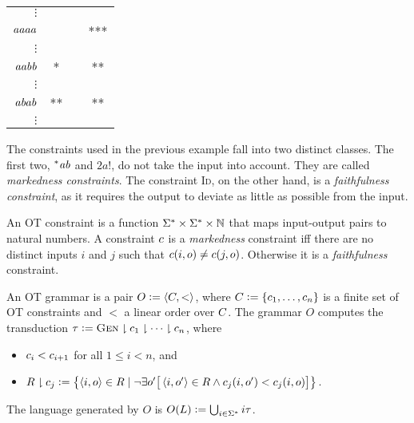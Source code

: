 \begin{examplebox}
\begin{center}
\begin{tabular}{rccc}
            $\vdots$ & & & \\
            $\mathit{aaaa}$ & & & ***\\
            $\vdots$ & & \\
            $\mathit{aabb}$ & * & & **\\
            $\vdots$ & & \\
            $\mathit{abab}$ & ** & & **\\
            $\vdots$ & & \\
            \bottomrule
        \end{tabular}
    \end{center}
\end{examplebox}

The constraints used in the previous example fall into two distinct classes. 
The first two, $^*\mathit{ab}$ and $2a!$, do not take the input into account. 
They are called \emph{markedness constraints}.
The constraint \textsc{Id}, on the other hand, is a \emph{faithfulness constraint}, as it requires the output to deviate as little as possible from the input.
%
\begin{definition}[OT Constraints]
    An OT constraint is a function $\Sigma^* \times  \Sigma^* \times \mathbb{N}$ that maps input-output pairs to natural numbers.
    A constraint $c$ is a \emph{markedness} constraint iff there are no distinct inputs $i$ and $j$ such that $c(i,o) \neq c(j,o)$.
    Otherwise it is a \emph{faithfulness} constraint.
\end{definition}

\begin{definition}
    An OT grammar is a pair $O \mathrel{\mathop:}= \left \langle C, < \right \rangle $, where $C \mathrel{\mathop:}= \left \{ c_1, \ldots, c_n \right \}$ is a finite set of OT constraints and $<$ a linear order over $C$.
    The grammar $O$ computes the transduction $\tau\mathrel{\mathop:}= \textsc{Gen} \downharpoonright c_1 \downharpoonright \cdots \downharpoonright c_n$, where
    \begin{itemize}
        \item $c_i < c_{i+1}$ for all $1 \leq i < n$, and
        \item $R \downharpoonright c_j \mathrel{\mathop:}= \left \{  \left \langle i,o \right \rangle  \in R \mid \neg \exists o' \big [ \left \langle i,o' \right \rangle  \in R \wedge c_j(i,o') < c_j(i,o) \big ]  \right \}$.
    \end{itemize}
    The language generated by $O$ is $O(L) \mathrel{\mathop:}= \bigcup_{i \in \Sigma^*} i\tau$.
\end{definition}

